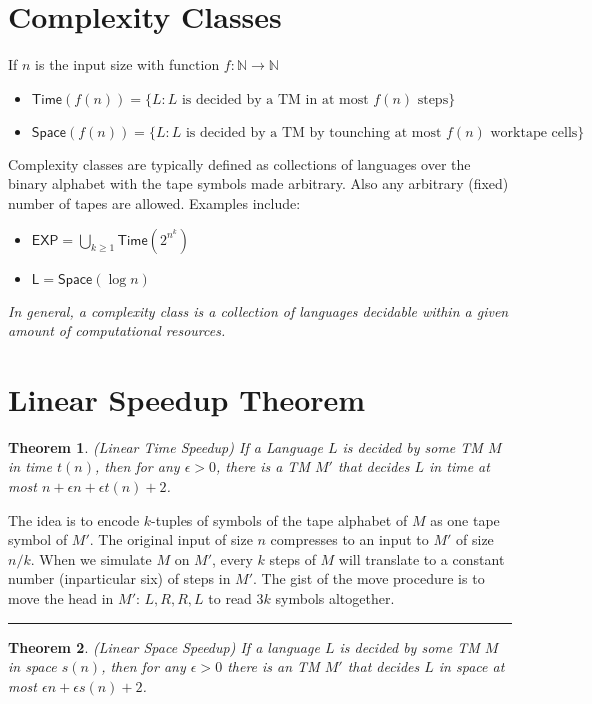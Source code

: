 \documentclass[twoside]{article}
\newcounter{lecnum}
\newtheorem{theorem}{Theorem}[lecnum]
\newenvironment{proof}{{\bf Proof:}}{\hfill\rule{2mm}{2mm}}
\def\N{\mathbb{N}}
\begin{document}
\section{Complexity Classes}
If $n$ is the input size with function $f: \N \rightarrow \N$
\begin{itemize}
\item $\mathsf{Time}(f(n)) = \{L: L \mbox{ is decided by a TM in at most } f(n) \mbox{ steps}\}$
\item $\mathsf{Space}(f(n)) = \{L: L \mbox{ is decided by a TM by tounching at most } f(n) \mbox{ worktape cells}\}$
\end{itemize}
Complexity classes are typically defined as collections of languages over the binary alphabet with the tape symbols made arbitrary. Also any arbitrary (fixed) number of tapes are allowed. Examples include:
\begin{itemize}
\item $\mathsf{EXP} = \bigcup_{k \geq 1} \mathsf{Time}(2^{n^k})$
\item $\mathsf{L} = \mathsf{Space}(\log n)$
\end{itemize}
\emph{In general, a complexity class is a collection of languages decidable within  a given amount of computational resources.}


\section{Linear Speedup Theorem}
\begin{theorem}
(Linear Time Speedup) If a Language $L$ is decided by some TM $M$ in time $t(n)$, then for any $\epsilon > 0$, there is a TM $M'$ that decides $L$ in time at most $n + \epsilon n +  \epsilon t(n) + 2$.
\end{theorem}
\begin{proof}
The idea is to encode $k$-tuples of symbols of the tape alphabet of $M$ as one tape symbol of $M'$. The original input of size $n$ compresses to an input to $M'$ of size $n/k$. When we simulate $M$ on $M'$, every $k$ steps of $M$ will translate to a constant number (inparticular six) of steps in $M'$. The gist of the move procedure is to move the head in $M'$: $L, R, R, L$ to read $3k$ symbols altogether. 
\end{proof}

\begin{theorem}
(Linear Space Speedup) If a language $L$ is decided by some TM $M$ in space $s(n)$, then for any $\epsilon > 0$ there is an TM $M'$ that decides $L$ in space at most $\epsilon n + \epsilon s(n) + 2$. 
\end{theorem}
\end{document}
